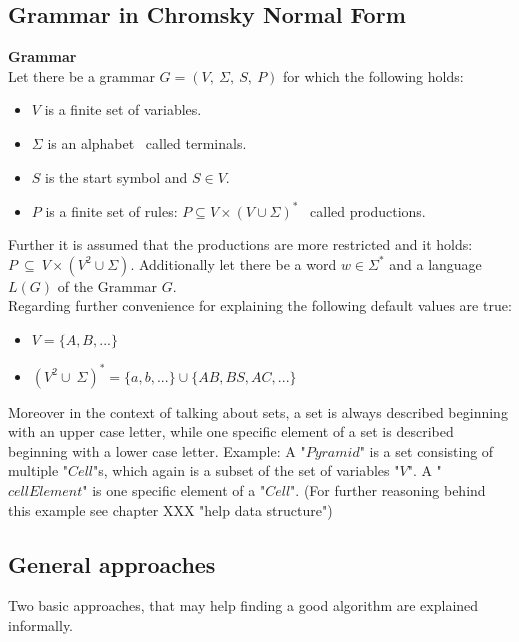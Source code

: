 \subsection{Grammar in Chromsky Normal Form}
\begin{DefGrey} \textbf{Grammar}\\
	Let there be a grammar $G=(V,\ \Sigma,\ S,\ P)$ for which the following holds:
	\begin{itemize}
		\item $V$ is a finite set of variables.
		\item $\Sigma$ is an alphabet \textendash~called terminals.
		\item $S$ is the start symbol and $S \in V$.
		\item $P$ is a finite set of rules: $P \subseteq V \times (V \cup \Sigma)^{*}$ \textendash~called productions.
	\end{itemize}
\end{DefGrey}
\noindent Further it is assumed that the productions are more restricted and it holds: $P\ \subseteq\ V \times (V^{2} \cup \Sigma)$. Additionally let there be a word $w \in \Sigma^*$ and a language $L(G)$ of the Grammar $G$. \\
\noindent Regarding further convenience for explaining the following default values are true:
\begin{itemize}
	\item $V = \{A, B, ...\}$
	\item $(V^2 \cup\ \Sigma)^{*}=\{a, b, ...\} \cup \{AB, BS, AC, ... \}$
\end{itemize}
\noindent Moreover in the context of talking about sets, a set is always described beginning with an upper case letter, while one specific element of a set is described beginning with a lower case letter. Example: A "$Pyramid$" is a set consisting of multiple "$Cell$"s, which again is a subset of the set of variables "$V$". A "$cellElement$" is one specific element of a "$Cell$". (For further reasoning behind this example see chapter XXX "help data structure") 
\pagebreak
\subsection{General approaches}
Two basic approaches, that may help finding a good algorithm are explained informally.
